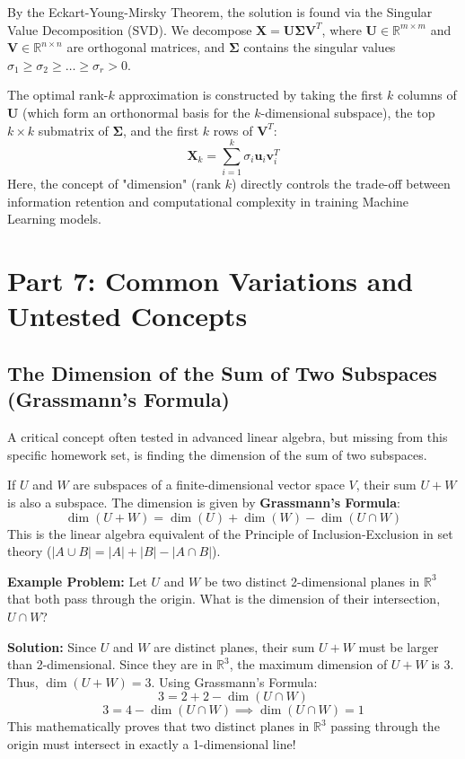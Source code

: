 \documentclass[12pt]{article}
\begin{document}
By the Eckart-Young-Mirsky Theorem, the solution is found via the Singular Value Decomposition (SVD). We decompose $\mathbf{X} = \mathbf{U} \mathbf{\Sigma} \mathbf{V}^T$, where $\mathbf{U} \in \mathbb{R}^{m \times m}$ and $\mathbf{V} \in \mathbb{R}^{n \times n}$ are orthogonal matrices, and $\mathbf{\Sigma}$ contains the singular values $\sigma_1 \ge \sigma_2 \ge \dots \ge \sigma_r > 0$.

The optimal rank-$k$ approximation is constructed by taking the first $k$ columns of $\mathbf{U}$ (which form an orthonormal basis for the $k$-dimensional subspace), the top $k \times k$ submatrix of $\mathbf{\Sigma}$, and the first $k$ rows of $\mathbf{V}^T$:
\[ \mathbf{X}_k = \sum_{i=1}^k \sigma_i \mathbf{u}_i \mathbf{v}_i^T \]
Here, the concept of "dimension" (rank $k$) directly controls the trade-off between information retention and computational complexity in training Machine Learning models.

\newpage
\section{Part 7: Common Variations and Untested Concepts}

\subsection{The Dimension of the Sum of Two Subspaces (Grassmann's Formula)}
A critical concept often tested in advanced linear algebra, but missing from this specific homework set, is finding the dimension of the sum of two subspaces. 

If $U$ and $W$ are subspaces of a finite-dimensional vector space $V$, their sum $U + W$ is also a subspace. The dimension is given by \textbf{Grassmann's Formula}:
\[ \dim(U + W) = \dim(U) + \dim(W) - \dim(U \cap W) \]
This is the linear algebra equivalent of the Principle of Inclusion-Exclusion in set theory ($|A \cup B| = |A| + |B| - |A \cap B|$).

\textbf{Example Problem:} Let $U$ and $W$ be two distinct 2-dimensional planes in $\mathbb{R}^3$ that both pass through the origin. What is the dimension of their intersection, $U \cap W$?

\textbf{Solution:}
Since $U$ and $W$ are distinct planes, their sum $U + W$ must be larger than 2-dimensional. Since they are in $\mathbb{R}^3$, the maximum dimension of $U + W$ is 3. Thus, $\dim(U + W) = 3$.
Using Grassmann's Formula:
\[ 3 = 2 + 2 - \dim(U \cap W) \]
\[ 3 = 4 - \dim(U \cap W) \implies \dim(U \cap W) = 1 \]
This mathematically proves that two distinct planes in $\mathbb{R}^3$ passing through the origin must intersect in exactly a 1-dimensional line!
\end{document}
